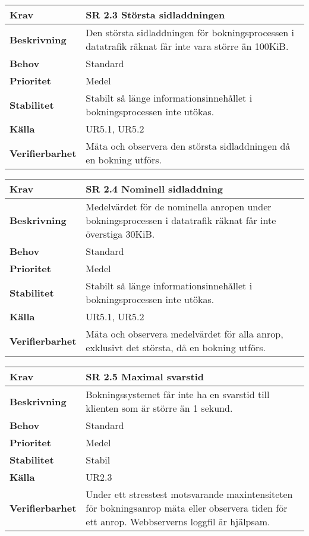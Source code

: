 \documentclass[a4paper, twoside, 11pt, titlepage]{article}
\begin{document}
\begin{tabular} { p{2.6cm} p{12.5cm} }
	\hline
	\sffamily\textbf{Krav} & \sffamily\textbf{SR 2.3 Största sidladdningen } \\
	\hline
	\sffamily\textbf{Beskrivning} & Den största sidladdningen för bokningsprocessen i datatrafik räknat får inte vara större än 100KiB.  \\
	\hline
	\sffamily\textbf{Behov} & Standard  \\
	\hline
	\sffamily\textbf{Prioritet} & Medel  \\
	\hline
	\sffamily\textbf{Stabilitet} & Stabilt så länge informationsinnehållet i bokningsprocessen inte utökas.  \\
	\hline
	\sffamily\textbf{Källa} & UR5.1, UR5.2  \\
	\hline
	\sffamily\textbf{Verifierbarhet} & Mäta och observera den största sidladdningen då en bokning utförs.  \\
	\hline
\end{tabular}
\vspace{6mm}

\begin{tabular} { p{2.6cm} p{12.5cm} }
	\hline
	\sffamily\textbf{Krav} & \sffamily\textbf{SR 2.4 Nominell sidladdning } \\
	\hline
	\sffamily\textbf{Beskrivning} & Medelvärdet för de nominella anropen under bokningsprocessen i datatrafik räknat får inte överstiga 30KiB.  \\
	\hline
	\sffamily\textbf{Behov} & Standard  \\
	\hline
	\sffamily\textbf{Prioritet} & Medel  \\
	\hline
	\sffamily\textbf{Stabilitet} & Stabilt så länge informationsinnehållet i bokningsprocessen inte utökas.  \\
	\hline
	\sffamily\textbf{Källa} & UR5.1, UR5.2  \\
	\hline
	\sffamily\textbf{Verifierbarhet} & Mäta och observera medelvärdet för alla anrop, exklusivt det största, då en bokning utförs.  \\
	\hline
\end{tabular}
\vspace{6mm}

\begin{tabular} { p{2.6cm} p{12.5cm} }
	\hline
	\sffamily\textbf{Krav} & \sffamily\textbf{SR 2.5 Maximal svarstid } \\
	\hline
	\sffamily\textbf{Beskrivning} & Bokningssystemet får inte ha en svarstid till klienten som är större än 1 sekund.  \\
	\hline
	\sffamily\textbf{Behov} & Standard  \\
	\hline
	\sffamily\textbf{Prioritet} & Medel  \\
	\hline
	\sffamily\textbf{Stabilitet} & Stabil  \\
	\hline
	\sffamily\textbf{Källa} &  UR2.3  \\
	\hline
	\sffamily\textbf{Verifierbarhet} & Under ett stresstest motsvarande maxintensiteten för bokningsanrop mäta eller observera tiden för ett anrop. Webbserverns loggfil är hjälpsam.  \\
	\hline
\end{tabular}
\end{document}
